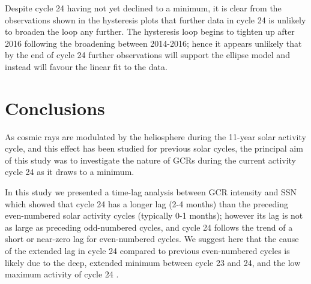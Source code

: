 Despite cycle 24 having not yet declined to a minimum, it is clear from the observations shown in the hysteresis plots that further data in cycle 24 is unlikely to broaden the loop any further. The hysteresis loop begins to tighten up after 2016 following the broadening between 2014-2016; hence it appears unlikely that by the end of cycle 24 further observations will support the ellipse model and instead will favour the linear fit to the data.


\section{Conclusions}

As cosmic rays are modulated by the heliosphere during the 11-year solar activity cycle, and this effect has been studied for previous solar cycles, the principal aim of this study was to investigate the nature of GCRs during the current activity cycle 24 as it draws to a minimum.

In this study we presented a time-lag analysis between GCR intensity and SSN which showed that cycle 24 has a longer lag (2-4 months) than the preceding even-numbered solar activity cycles (typically 0-1 months); however its lag is not as large as preceding odd-numbered cycles, and cycle 24 follows the trend of a short or near-zero lag for even-numbered cycles. We suggest here that the cause of the extended lag in cycle 24 compared to previous even-numbered cycles is likely due to the deep, extended minimum between cycle 23 and 24, and the low maximum activity of cycle 24 \citep{broomhall_helioseismic_2017}.



